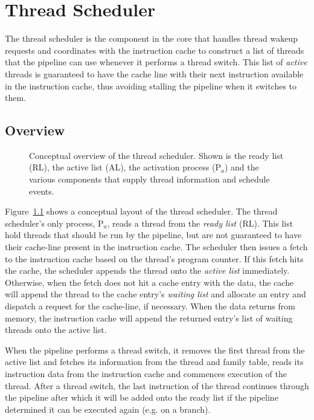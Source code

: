 \chapter{Thread Scheduler}

The thread scheduler is the component in the core that handles thread wakeup requests and coordinates with the instruction cache to construct a list of threads that the pipeline can use whenever it performs a thread switch. This list of \emph{active} threads is guaranteed to have the cache line with their next instruction available in the instruction cache, thus avoiding stalling the pipeline when it switches to them.

\section{Overview}

\begin{figure}
 \begin{center}
  
  \caption{Conceptual overview of the thread scheduler. Shown is the ready list (RL), the active list (AL), the activation process (P$_a$) and the various components that supply thread information and schedule events.}
  \label{fig:scheduler-overview}
 \end{center}
\end{figure}

Figure~\ref{fig:scheduler-overview} shows a conceptual layout of the thread scheduler. The thread scheduler's only process, P$_a$, reads a thread from the \emph{ready list} (RL). This list hold threads that should be run by the pipeline, but are not guaranteed to have their cache-line present in the instruction cache. The scheduler then issues a fetch to the instruction cache based on the thread's program counter. If this fetch hits the cache, the scheduler appends the thread onto the \emph{active list} immediately. Otherwise, when the fetch does not hit a cache entry with the data, the cache will append the thread to the cache entry's \emph{waiting list} and allocate an entry and dispatch a request for the cache-line, if necessary. When the data returns from memory, the instruction cache will append the returned entry's list of waiting threads onto the active list. 

When the pipeline performs a thread switch, it removes the first thread from the active list and fetches its information from the thread and family table, reads its instruction data from the instruction cache and commences execution of the thread. After a thread switch, the last instruction of the thread continues through the pipeline after which it will be added onto the ready list if the pipeline determined it can be executed again (e.g. on a branch). 

